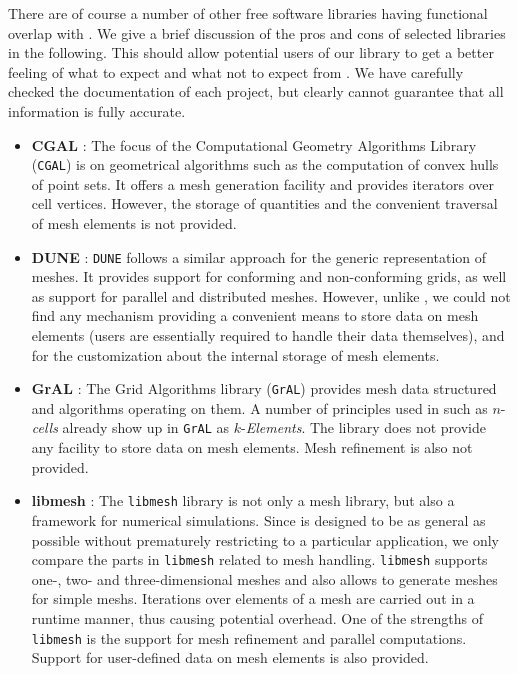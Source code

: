 There are of course a number of other free software libraries having functional overlap with {\ViennaGrid}.
We give a brief discussion of the pros and cons of selected libraries in the following.
This should allow potential users of our library to get a better feeling of what to expect and what not to expect from {\ViennaGrid}.
We have carefully checked the documentation of each project, but clearly cannot guarantee that all information is fully accurate.
\begin{itemize}
  \item \textbf{CGAL} \cite{CGAL}: The focus of the Computational Geometry Algorithms Library (\texttt{CGAL}) is on geometrical algorithms such as the computation of convex hulls of point sets.
        It offers a mesh generation facility and provides iterators over cell vertices.
        However, the storage of quantities and the convenient traversal of mesh elements is not provided.

  \item \textbf{DUNE} \cite{DUNE}: \texttt{DUNE} follows a similar approach for the generic representation of meshes.
        It provides support for conforming and non-conforming grids, as well as support for parallel and distributed meshes.
        However, unlike {\ViennaGrid}, we could not find any mechanism providing a convenient means to store data on mesh elements (users are essentially required to handle their data themselves), and for the customization about the internal storage of mesh elements.

  \item \textbf{GrAL} \cite{GrAL}: The Grid Algorithms library (\texttt{GrAL}) provides mesh data structured and algorithms operating on them.
        A number of principles used in {\ViennaGrid} such as $n$-\textit{cells} already show up in \texttt{GrAL} as $k$-\textit{Elements}.
        The library does not provide any facility to store data on mesh elements.
        Mesh refinement is also not provided.

  \item \textbf{libmesh} \cite{libmesh}: The \texttt{libmesh} library is not only a mesh library, but also a framework for numerical simulations.
        Since {\ViennaGrid} is designed to be as general as possible without prematurely restricting to a particular application, we only compare the parts in \texttt{libmesh} related to mesh handling.
        \texttt{libmesh} supports one-, two- and three-dimensional meshes and also allows to generate meshes for simple meshs.
        Iterations over elements of a mesh are carried out in a runtime manner, thus causing potential overhead.
        One of the strengths of \texttt{libmesh} is the support for mesh refinement and parallel computations.
        Support for user-defined data on mesh elements is also provided.


\end{itemize}
